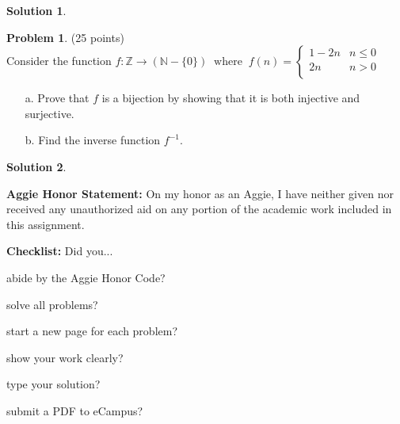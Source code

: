 \documentclass{article}
\theoremstyle{definition}
\newtheorem{problem}{Problem}
\newtheorem*{solution}{Solution}
\newcommand{\honor}{\noindent \textbf{Aggie Honor Statement: }On my honor as an Aggie, I have neither
  given nor received any unauthorized aid on any portion of the academic work included in this assignment.
}
\newcommand{\checklist}{\noindent\textbf{Checklist:}
Did you...
\begin{compactenum}
\item abide by the Aggie Honor Code?
\item solve all problems?
\item start a new page for each problem?
\item show your work clearly?
\item type your solution?
\item submit a PDF to eCampus?
\end{compactenum}
}
\begin{document}
\begin{solution}\ \\



\end{solution}

\newpage

\begin{problem} (25 points)\\
Consider the function $f: \mathbb{Z} \to (\mathbb{N}-\{0\})~\text{ where }~f(n) = \left\{
\begin{array}{ll}
1-2n & n \leq 0\\
2n & n > 0\\
\end{array}\right.$
\begin{enumerate}
\item[a.] Prove that $f$ is a bijection by showing that it is both injective and surjective.
\item[b.] Find the inverse function $f^{-1}$.
\end{enumerate}
\end{problem}

\begin{solution}\ \\




\end{solution}

\newpage

\bigskip
\honor

\bigskip
\checklist
\end{document}
